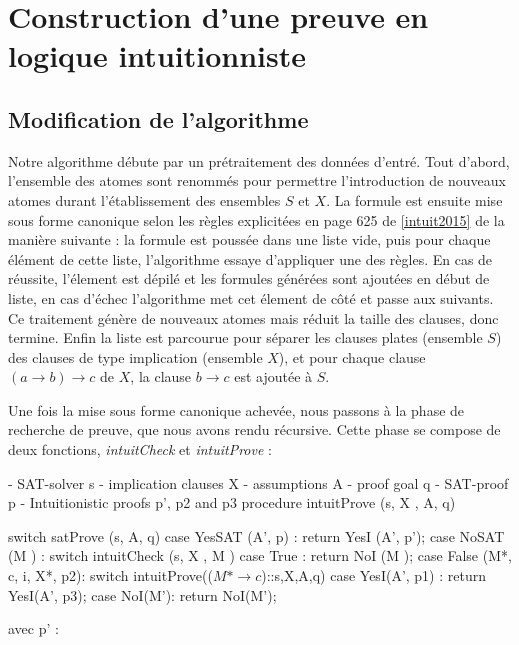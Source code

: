 \section{Construction d'une preuve en logique intuitionniste}

\subsection{Modification de l'algorithme}

Notre algorithme d\'ebute par un pr\'etraitement des donn\'ees d'entr\'e.
Tout d'abord, l'ensemble des atomes sont renomm\'es pour permettre l'introduction de nouveaux atomes durant l'\'etablissement des ensembles $S$ et $X$. La formule est ensuite mise sous forme canonique selon les r\`egles explicit\'ees en page 625 de \ref{intuit2015} de la mani\`ere suivante : la formule est pouss\'ee dans une liste vide, puis pour chaque élément de cette liste, l'algorithme essaye d'appliquer une des r\`egles. En cas de réussite, l'\'element est d\'epil\'e et les formules g\'en\'er\'ees sont ajout\'ees en d\'ebut de liste, en cas d'\'echec l'algorithme met cet \'element de c\^ot\'e et passe aux suivants. Ce traitement g\'en\`ere de nouveaux atomes mais r\'eduit la taille des clauses, donc termine. Enfin la liste est parcourue pour s\'eparer les clauses plates (ensemble $S$) des clauses de type implication (ensemble $X$), et pour chaque clause $(a \rightarrow b) \rightarrow c$ de $X$, la clause $b \rightarrow c$ est ajout\'ee \`a $S$.

Une fois la mise sous forme canonique achev\'ee, nous passons à la phase de recherche de preuve, que nous avons rendu récursive. Cette phase se compose de deux fonctions, \textit{intuitCheck} et \textit{intuitProve} :

- SAT-solver s
- implication clauses X
- assumptions A
- proof goal q
- SAT-proof p
- Intuitionistic proofs p', p2 and p3
procedure intuitProve (s, X , A, q)

switch satProve (s, A, q)
case YesSAT (A', p) :
return YesI (A', p');
case NoSAT (M ) :
switch intuitCheck (s, X , M )
case True :
return NoI (M );
case False (M*, c, i, X*, p2):
switch intuitProve(($M* \rightarrow c$)::s,X,A,q)
case YesI(A', p1) :
return YesI(A', p3);
case NoI(M'):
return NoI(M');

avec p' :
\begin{prooftree}
\end{prooftree}

